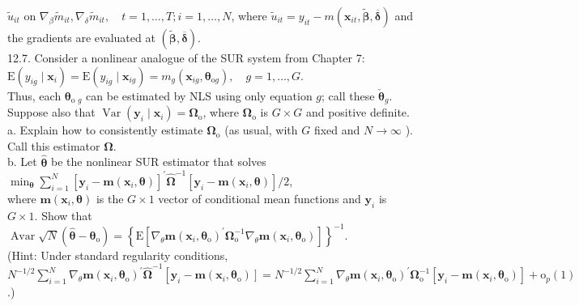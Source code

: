 \documentclass[10pt]{article}
\begin{document}
$\tilde{u}_{i t}$ on $\nabla_{\beta} \tilde{m}_{i t}, \nabla_{\delta} \tilde{m}_{i t}, \quad t=1, \ldots, T ; i=1, \ldots, N$, where $\tilde{u}_{i t}=y_{i t}-m\left(\mathbf{x}_{i t}, \tilde{\boldsymbol{\beta}}, \overline{\boldsymbol{\delta}}\right)$ and the gradients are evaluated at $(\tilde{\boldsymbol{\beta}}, \overline{\boldsymbol{\delta}})$.\\
12.7. Consider a nonlinear analogue of the SUR system from Chapter 7:\\
$\mathrm{E}\left(y_{i g} \mid \mathbf{x}_{i}\right)=\mathrm{E}\left(y_{i g} \mid \mathbf{x}_{i g}\right)=m_{g}\left(\mathbf{x}_{i g}, \boldsymbol{\theta}_{\mathrm{o} g}\right), \quad g=1, \ldots, G$.\\
Thus, each $\boldsymbol{\theta}_{\text {o } g}$ can be estimated by NLS using only equation $g$; call these $\check{\boldsymbol{\theta}}_{g}$. Suppose also that $\operatorname{Var}\left(\mathbf{y}_{i} \mid \mathbf{x}_{i}\right)=\boldsymbol{\Omega}_{\mathrm{o}}$, where $\boldsymbol{\Omega}_{\mathrm{o}}$ is $G \times G$ and positive definite.\\
a. Explain how to consistently estimate $\boldsymbol{\Omega}_{\mathrm{o}}$ (as usual, with $G$ fixed and $N \rightarrow \infty$ ). Call this estimator $\hat{\boldsymbol{\Omega}}$.\\
b. Let $\hat{\boldsymbol{\theta}}$ be the nonlinear SUR estimator that solves\\
$\min _{\boldsymbol{\theta}} \sum_{i=1}^{N}\left[\mathbf{y}_{i}-\mathbf{m}\left(\mathbf{x}_{i}, \boldsymbol{\theta}\right)\right]^{\prime} \hat{\boldsymbol{\Omega}}^{-1}\left[\mathbf{y}_{i}-\mathbf{m}\left(\mathbf{x}_{i}, \boldsymbol{\theta}\right)\right] / 2$,\\
where $\mathbf{m}\left(\mathbf{x}_{i}, \boldsymbol{\theta}\right)$ is the $G \times 1$ vector of conditional mean functions and $\mathbf{y}_{i}$ is $G \times 1$. Show that\\
$\operatorname{Avar} \sqrt{N}\left(\hat{\boldsymbol{\theta}}-\boldsymbol{\theta}_{\mathrm{o}}\right)=\left\{\mathrm{E}\left[\nabla_{\theta} \mathbf{m}\left(\mathbf{x}_{i}, \boldsymbol{\theta}_{\mathrm{o}}\right)^{\prime} \boldsymbol{\Omega}_{\mathrm{o}}^{-1} \nabla_{\theta} \mathbf{m}\left(\mathbf{x}_{i}, \boldsymbol{\theta}_{\mathrm{o}}\right)\right]\right\}^{-1}$.\\
(Hint: Under standard regularity conditions, $N^{-1 / 2} \sum_{i=1}^{N} \nabla_{\theta} \mathbf{m}\left(\mathbf{x}_{i}, \boldsymbol{\theta}_{\mathrm{o}}\right)^{\prime} \hat{\boldsymbol{\Omega}}^{-1}\left[\mathbf{y}_{i}-\right. \left.\mathbf{m}\left(\mathbf{x}_{i}, \boldsymbol{\theta}_{\mathrm{o}}\right)\right]=N^{-1 / 2} \sum_{i=1}^{N} \nabla_{\theta} \mathbf{m}\left(\mathbf{x}_{i}, \boldsymbol{\theta}_{\mathrm{o}}\right)^{\prime} \boldsymbol{\Omega}_{\mathrm{o}}^{-1}\left[\mathbf{y}_{i}-\mathbf{m}\left(\mathbf{x}_{i}, \boldsymbol{\theta}_{\mathrm{o}}\right)\right]+\mathrm{o}_{p}(1)$.)\\
\end{document}

